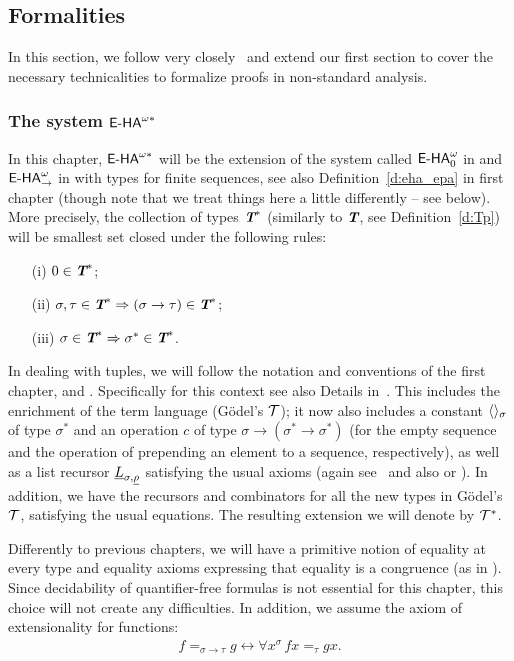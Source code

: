 \subsection{Formalities}

In this section, we follow very closely~\cite{BBS12} and extend our first section to cover the necessary
technicalities to formalize proofs in non-standard analysis.

\subsubsection*{The system ${\textsf{\upshape E-HA}}^{\omega*}$}

In this chapter, ${\textsf{\upshape E-HA}}^{\omega*}$ will be the extension of the system called ${\textsf{\upshape E-HA}}^{\omega}_0$ in \cite{Troelstra73} and ${\textsf{\upshape E-HA}}_{\to}^\omega$ in \cite{troelstravandalen88b} with types for finite sequences, see also Definition~\ref{d:eha_epa} in first chapter (though note that we treat things here a little differently -- see below). More precisely, the collection of types $\emph{\protect\textbf{T}}^*$ 
(similarly to $\emph{\protect\textbf{T}}$, see Definition~\ref{d:Tp}) will be smallest set closed under the following rules:
\begin{enumerate}
\item[(i)] $0 \in \emph{\protect\textbf{T}}^*$;
\item[(ii)] $\sigma, \tau \in \emph{\protect\textbf{T}}^* \Rightarrow (\sigma \to \tau) \in \emph{\protect\textbf{T}}^*$;
\item[(iii)] $\sigma \in \emph{\protect\textbf{T}}^* \Rightarrow \sigma^* \in \emph{\protect\textbf{T}}^*$.
\end{enumerate}

In dealing with tuples, we will follow the notation and conventions of the first chapter, \cite{Troelstra73} and \cite{Kohlenbach08}. Specifically 
for this context see also Details in~\cite{BBS12}. This includes the enrichment of the term language (G\"odel's $\mathcal{T}$); it now also includes a constant $\langle\rangle_\sigma$ of type $\sigma^*$ and an operation $c$ of type $\sigma \to (\sigma^* \to \sigma^*)$ (for the empty sequence and the operation of prepending an element to a sequence, respectively), as well as a list recursor $\underline L_{\sigma, \underline \rho}$ satisfying the usual axioms (again see~\cite{BBS12} and also
\cite[p. 456]{troelstravandalen88b} or \cite[p. 48]{Kohlenbach08}). In addition, we have the recursors and combinators for all the new types in G\"odel's $\mathcal{T}$, satisfying the usual equations.  The resulting extension we will denote by $\mathcal{T}^*$.

Differently to previous chapters, we will have a primitive notion of equality at every type and equality axioms expressing that equality is a congruence (as in \cite[p. 448-9]{troelstravandalen88b}). Since decidability of quantifier-free formulas is not essential for this chapter, this choice will not create any difficulties. In addition, we assume the axiom of extensionality for functions:
\begin{displaymath}
\begin{array}{l}
f =_{\sigma \to \tau} g \leftrightarrow \forall x^\sigma \, fx =_{\tau} gx.
\end{array}
\end{displaymath}

